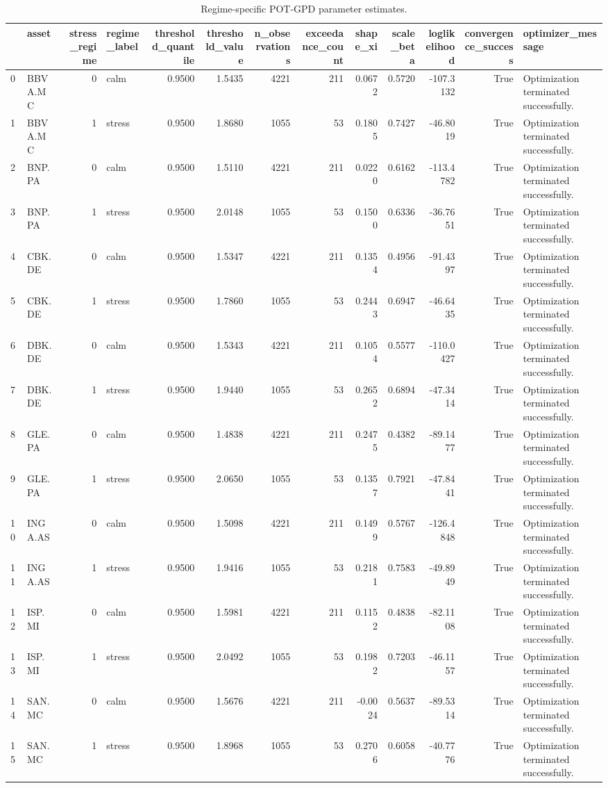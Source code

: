 \begin{table}
\caption{Regime-specific POT-GPD parameter estimates.}
\label{tab:evt_gpd_params_regime}
\begin{tabular}{llrlrrrrrrrrl}
\toprule
 & asset & stress_regime & regime_label & threshold_quantile & threshold_value & n_observations & exceedance_count & shape_xi & scale_beta & loglikelihood & convergence_success & optimizer_message \\
\midrule
0 & BBVA.MC & 0 & calm & 0.9500 & 1.5435 & 4221 & 211 & 0.0672 & 0.5720 & -107.3132 & True & Optimization terminated successfully. \\
1 & BBVA.MC & 1 & stress & 0.9500 & 1.8680 & 1055 & 53 & 0.1805 & 0.7427 & -46.8019 & True & Optimization terminated successfully. \\
2 & BNP.PA & 0 & calm & 0.9500 & 1.5110 & 4221 & 211 & 0.0220 & 0.6162 & -113.4782 & True & Optimization terminated successfully. \\
3 & BNP.PA & 1 & stress & 0.9500 & 2.0148 & 1055 & 53 & 0.1500 & 0.6336 & -36.7651 & True & Optimization terminated successfully. \\
4 & CBK.DE & 0 & calm & 0.9500 & 1.5347 & 4221 & 211 & 0.1354 & 0.4956 & -91.4397 & True & Optimization terminated successfully. \\
5 & CBK.DE & 1 & stress & 0.9500 & 1.7860 & 1055 & 53 & 0.2443 & 0.6947 & -46.6435 & True & Optimization terminated successfully. \\
6 & DBK.DE & 0 & calm & 0.9500 & 1.5343 & 4221 & 211 & 0.1054 & 0.5577 & -110.0427 & True & Optimization terminated successfully. \\
7 & DBK.DE & 1 & stress & 0.9500 & 1.9440 & 1055 & 53 & 0.2652 & 0.6894 & -47.3414 & True & Optimization terminated successfully. \\
8 & GLE.PA & 0 & calm & 0.9500 & 1.4838 & 4221 & 211 & 0.2475 & 0.4382 & -89.1477 & True & Optimization terminated successfully. \\
9 & GLE.PA & 1 & stress & 0.9500 & 2.0650 & 1055 & 53 & 0.1357 & 0.7921 & -47.8441 & True & Optimization terminated successfully. \\
10 & INGA.AS & 0 & calm & 0.9500 & 1.5098 & 4221 & 211 & 0.1499 & 0.5767 & -126.4848 & True & Optimization terminated successfully. \\
11 & INGA.AS & 1 & stress & 0.9500 & 1.9416 & 1055 & 53 & 0.2181 & 0.7583 & -49.8949 & True & Optimization terminated successfully. \\
12 & ISP.MI & 0 & calm & 0.9500 & 1.5981 & 4221 & 211 & 0.1152 & 0.4838 & -82.1108 & True & Optimization terminated successfully. \\
13 & ISP.MI & 1 & stress & 0.9500 & 2.0492 & 1055 & 53 & 0.1982 & 0.7203 & -46.1157 & True & Optimization terminated successfully. \\
14 & SAN.MC & 0 & calm & 0.9500 & 1.5676 & 4221 & 211 & -0.0024 & 0.5637 & -89.5314 & True & Optimization terminated successfully. \\
15 & SAN.MC & 1 & stress & 0.9500 & 1.8968 & 1055 & 53 & 0.2706 & 0.6058 & -40.7776 & True & Optimization terminated successfully. \\
\bottomrule
\end{tabular}
\end{table}

